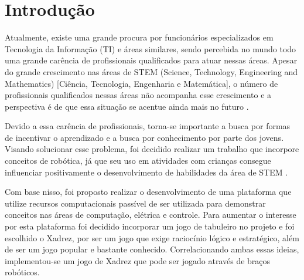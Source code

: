 \chapter[Introdução]{Introdução}
\label{cap:introducao}

Atualmente, existe uma grande procura por funcionários especializados em Tecnologia da Informação (TI) e áreas similares, sendo percebida no mundo todo uma grande carência de profissionais qualificados para atuar nessas áreas.
Apesar do grande crescimento nas áreas de STEM (Science, Technology, Engineering and Mathematics) [Ciência, Tecnologia, Engenharia e Matemática], o número de profissionais qualificados nessas áreas não acompanha esse crescimento e a perspectiva é de que essa situação se acentue ainda mais no futuro \cite{shortage_of_workers}.

Devido a essa carência de profissionais, torna-se importante a busca por formas de incentivar o aprendizado e a busca por conhecimento por parte dos jovens.
Visando solucionar esse problema, foi decidido realizar um trabalho que incorpore conceitos de robótica, já que seu uso em atividades com crianças consegue influenciar positivamente o desenvolvimento de habilidades da área de STEM \cite{technology_for_stem}.

Com base nisso, foi proposto realizar o desenvolvimento de uma plataforma que utilize recursos computacionais passível de ser utilizada para demonstrar conceitos nas áreas de computação, elétrica e controle.
Para aumentar o interesse por esta plataforma foi decidido incorporar um jogo de tabuleiro no projeto e foi escolhido o Xadrez, por ser um jogo que exige raciocínio lógico e estratégico, além de ser um jogo popular e bastante conhecido.
Correlacionando ambas essas ideias, implementou-se um jogo de Xadrez que pode ser jogado através de braços robóticos.